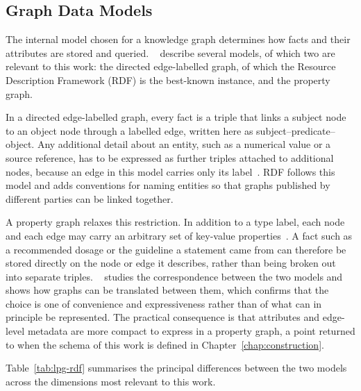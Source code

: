 \subsection{Graph Data Models}
\label{sec:bg-kg-models}

The internal model chosen for a knowledge graph determines how facts and their
attributes are stored and queried. ~\cite{hogan2021} describe
several models, of which two are relevant to this work: the directed
edge-labelled graph, of which the Resource Description Framework (RDF) is the
best-known instance, and the property graph.

In a directed edge-labelled graph, every fact is a triple that links a subject
node to an object node through a labelled edge, written here as
subject--predicate--object. Any additional detail about an entity, such as a
numerical value or a source reference, has to be expressed as further triples
attached to additional nodes, because an edge in this model carries only its
label~\cite{hogan2021}. RDF follows this model and adds conventions for naming
entities so that graphs published by different parties can be linked together.

A property graph relaxes this restriction. In addition to a type label, each
node and each edge may carry an arbitrary set of key-value
properties~\cite{hogan2021}. A fact such as a recommended dosage or the
guideline a statement came from can therefore be stored directly on the node
or edge it describes, rather than being broken out into separate triples.
~\cite{hartig2014} studies the correspondence between the two models and
shows how graphs can be translated between them, which confirms that the
choice is one of convenience and expressiveness rather than of what can in
principle be represented. The practical consequence is that attributes and
edge-level metadata are more compact to express in a property graph, a point
returned to when the schema of this work is defined in
Chapter~\ref{chap:construction}.

Table~\ref{tab:lpg-rdf} summarises the principal differences between the two
models across the dimensions most relevant to this work.

